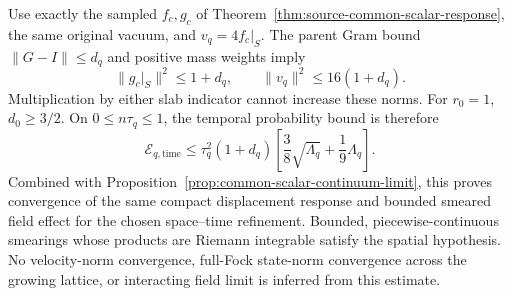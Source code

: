 Use exactly the sampled $f_c,g_c$ of
Theorem~\ref{thm:source-common-scalar-response}, the same original vacuum,
and $v_q=4f_c|_S$. The parent Gram bound $\|G-I\|\le d_q$ and positive
mass weights imply
\[
 \|g_c|_S\|^2\le1+d_q,\qquad
 \|v_q\|^2\le16(1+d_q).
\]
Multiplication by either slab indicator cannot increase these norms.
For $r_0=1$, $d_0\ge3/2$. On $0\le n\tau_q\le1$, the temporal
probability bound is therefore
\begin{equation}
 \mathcal E_{q,\mathrm{time}}
 \le\tau_q^2(1+d_q)
       \left[\frac38\sqrt{\Lambda_q}+\frac19\Lambda_q\right].
 \label{eq:source-scalar-time-compact-bound}
\end{equation}
Combined with Proposition~\ref{prop:common-scalar-continuum-limit}, this
proves convergence of the same compact displacement response and bounded
smeared field effect for the chosen space--time refinement. Bounded,
piecewise-continuous smearings whose products are Riemann integrable satisfy
the spatial hypothesis. No velocity-norm convergence, full-Fock state-norm
convergence across the growing lattice, or interacting field limit is
inferred from this estimate.

